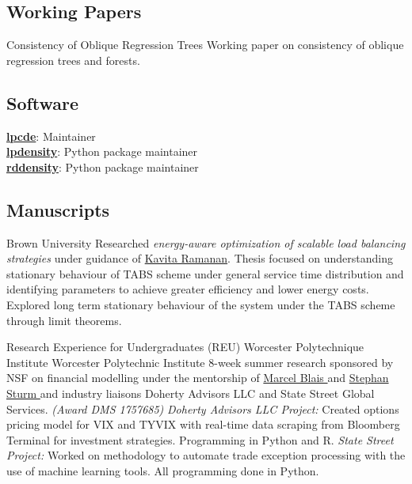 \documentclass[10pt,a4paper,roman]{moderncv}        %
\begin{document}
\subsection{Working Papers}
{Consistency of Oblique Regression Trees}{}{}
{Working paper on consistency of oblique regression trees and forests.}

\subsection{Software}
\color{blue}\href{https://nppackages.github.io/lpcde/}{\textbf{lpcde}}\color{black}: Maintainer
\\
\color{blue}\href{https://nppackages.github.io/lpdensity/}{\textbf{lpdensity}}\color{black}: Python package maintainer
\\
\color{blue}\href{https://rdpackages.github.io/rddensity/}{\textbf{rddensity}}\color{black}: Python package maintainer

\subsection{Manuscripts}
{Brown University}{}
{Researched \textit{energy-aware optimization of scalable load balancing
  strategies} under guidance of 
\color{blue}\href{https://www.brown.edu/academics/applied-mathematics/faculty/kavita-ramanan/home}{Kavita
  Ramanan}\color{black}.
Thesis focused on understanding stationary behaviour of TABS scheme
under general service time distribution and identifying parameters
to achieve greater efficiency and lower energy costs.
Explored long term stationary behaviour of the system under the TABS scheme through limit theorems.}

{Research Experience for Undergraduates (REU) }
{Worcester Polytechnique Institute}
{Worcester Polytechnic Institute}
{8-week summer research sponsored by NSF on financial modelling under the
  mentorship of
  \color{blue}\href{https://www.wpi.edu/people/faculty/myblais}{Marcel Blais
  }\color{black}
  and \color{blue}\href{https://www.wpi.edu/people/faculty/ssturm}{Stephan Sturm
  }\color{black}
  and industry liaisons Doherty Advisors LLC and State Street Global Services.
  \textit{(Award DMS 1757685)}
  \newline{}%
\textit{Doherty Advisors LLC Project:}
Created options pricing model for VIX and TYVIX with real-time data scraping
from Bloomberg Terminal for investment strategies.
Programming in Python and R.
\newline{}
\textit{State Street Project:}
Worked on methodology to automate trade exception processing with the use of
machine learning tools. All programming done in Python.
}
\end{document}
